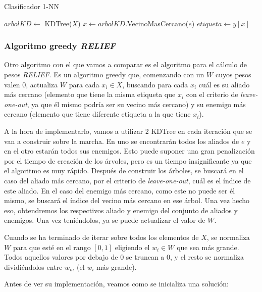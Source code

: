 \documentclass[11pt,a4paper]{article}
\begin{document}
\begin{algorithm}[H]
\caption{Clasificador 1-NN}
\begin{algorithmic}[1]
\State $arbolKD \gets$ KDTree($X$)
\State $x \gets arbolKD$.VecinoMasCercano($e$)
\State $etiqueta \gets y[x]$
\State {}
\EndFunction
\end{algorithmic}
\end{algorithm}

\newpage

\subsubsection{Algoritmo greedy \textit{RELIEF}}

Otro algoritmo con el que vamos a comparar es el algoritmo para el cálculo de pesos \textit{RELIEF}. Es un algoritmo
greedy que, comenzando con un $W$ cuyos pesos valen 0, actualiza $W$ para cada $x_i \in X$, buscando para cada $x_i$ cuál es
su aliado más cercano (elemento que tiene la misma etiqueta que $x_i$ con el criterio de \textit{leave-one-out}, ya que él
mismo podría ser su vecino más cercano) y su enemigo más cercano (elemento que tiene diferente etiqueta a la que tiene $x_i$).

A la hora de implementarlo, vamos a utilizar 2 KDTree en cada iteración que se van a construir sobre la marcha. En uno se
encontrarán todos los aliados de $e$ y en el otro estarán todos sus enemigos. Esto puede suponer una gran penalización por el
tiempo de creación de los árvoles, pero es un tiempo insignificante ya que el algoritmo es muy rápido. Después de construir los
árboles, se buscará en el caso del aliado más cercano, por el criterio de \textit{leave-one-out}, cuál es el índice de este
aliado. En el caso del enemigo más cercano, como este no puede ser él mismo, se buscará el índice del vecino más cercano en ese
árbol. Una vez hecho eso, obtendremos los respectivos aliado y enemigo del conjunto de aliados y enemigos. Una vez teniéndolos,
ya se puede actualizar el valor de $W$.

Cuando se ha terminado de iterar sobre todos los elementos de $X$, se normaliza $W$ para que esté en el rango $[0, 1]$ 
eligiendo el $w_i \in W$ que sea más grande. Todos aquellos valores por debajo de 0 se truncan a 0, y el resto se normaliza
dividiéndolos entre $w_m$ (el $w_i$ más grande).

Antes de ver su implementación, veamos como se inicializa una solución:
\end{document}
